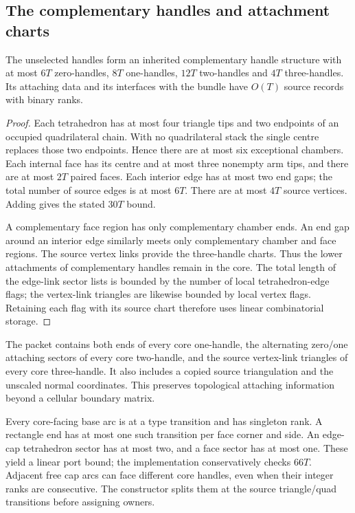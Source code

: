 \subsection{The complementary handles and attachment charts}

\begin{proposition}
The unselected handles form an inherited complementary handle structure
with at most $6T$ zero-handles, $8T$ one-handles, $12T$ two-handles and $4T$
three-handles. Its attaching data and its interfaces with the bundle have
$O(T)$ source records with binary ranks.
\end{proposition}
\begin{proof}
Each tetrahedron has at most four triangle tips and two endpoints of an
occupied quadrilateral chain. With no quadrilateral stack the single centre
replaces those two endpoints. Hence there are at most six exceptional
chambers. Each internal face has its centre and at most three nonempty arm
tips, and there are at most $2T$ paired faces. Each interior edge has at most
two end gaps; the total number of source edges is at most $6T$. There are at
most $4T$ source vertices. Adding gives the stated $30T$ bound.

A complementary face region has only complementary chamber ends. An end
gap around an interior edge similarly meets only complementary chamber and
face regions. The source vertex links provide the three-handle charts.
Thus the lower attachments of complementary handles remain in the core.
The total length of the edge-link sector lists is bounded by the number of
local tetrahedron-edge flags; the vertex-link triangles are likewise bounded
by local vertex flags. Retaining each flag with its source chart therefore
uses linear combinatorial storage.
\end{proof}

The packet contains both ends of every core one-handle, the alternating
zero/one attaching sectors of every core two-handle, and the source
vertex-link triangles of every core three-handle. It also includes a copied
source triangulation and the unscaled normal coordinates. This preserves
topological attaching information beyond a cellular boundary matrix.

Every core-facing base arc is at a type transition and has singleton rank.
A rectangle end has at most one such transition per face corner and side.
An edge-cap tetrahedron sector has at most two, and a face sector has at
most one. These yield a linear port bound; the implementation conservatively
checks $66T$. Adjacent free cap arcs can face different core handles, even
when their integer ranks are consecutive. The constructor splits them at
the source triangle/quad transitions before assigning owners.

